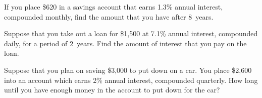 \documentclass[11pt,letterpaper]{article}
\begin{document}

 If you place \$620 in a savings account that earns 1.3\% annual interest, compounded monthly, find the amount that you have after 8~years.



\newpage



 Suppose that you take out a loan for \$1,500 at 7.1\% annual interest, compounded daily, for a period of 2~years. Find the amount of interest that you pay on the loan. 



\newpage



 Suppose that you plan on saving \$3,000 to put down on a car. You place \$2,600 into an account which earns 2\% annual interest, compounded quarterly. How long until you have enough money in the account to put down for the car?
\end{document}
